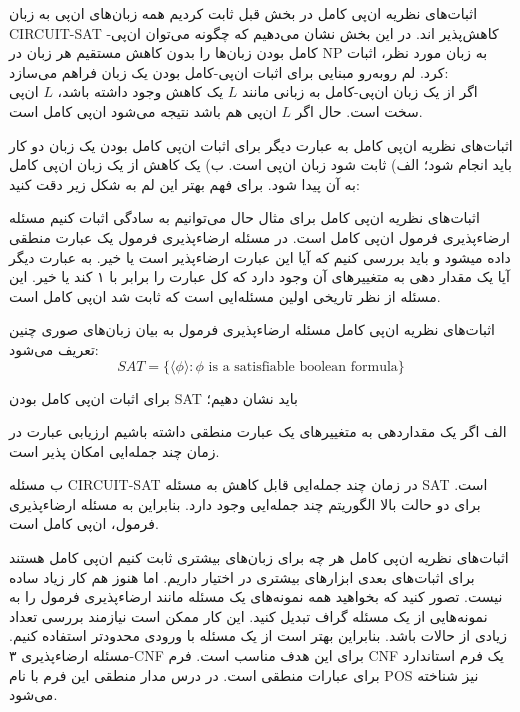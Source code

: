 \begin{itemframe}{اثبات‌های نظریه ان‌پی کامل}
\itm
در بخش قبل ثابت کردیم همه زبان‌های ان‌پی به زبان CIRCUIT-SAT کاهش‌پذیر اند.
\itm
در این بخش نشان می‌دهیم که چگونه می‌توان ان‌پی-کامل بودن زبان‌ها را بدون کاهش مستقیم هر زبان در NP به زبان مورد نظر، اثبات کرد.
\itm
لم روبه‌رو مبنایی برای اثبات ان‌پی-کامل بودن یک زبان فراهم می‌سازد:\\
اگر از یک زبان ان‌پی-کامل به زبانی مانند $L$ یک کاهش وجود داشته باشد، $L$ ان‌پی سخت است. حال اگر $L$ ان‌پی هم باشد نتیجه می‌شود ان‌پی کامل است.
\end{itemframe}


\begin{itemframe}{اثبات‌های نظریه ان‌پی کامل}
\itm
به عبارت دیگر برای اثبات ان‌پی کامل بودن یک زبان دو کار باید انجام شود؛‌ الف) ثابت شود زبان ان‌پی است. ب) یک کاهش از یک زبان ان‌پی کامل به آن پیدا شود.
\itm
برای فهم بهتر این لم به شکل زیر دقت کنید:
\end{itemframe}


\begin{itemframe}{اثبات‌های نظریه ان‌پی کامل}
\itm
برای مثال حال می‌توانیم به سادگی اثبات کنیم مسئله ارضاء‌پذیری فرمول
ان‌پی کامل است.
\itm
در مسئله ارضاءپذیری فرمول یک عبارت منطقی داده میشود و‌ باید بررسی کنیم که آیا این عبارت ارضاءپذیر است یا خیر. به عبارت دیگر آیا یک مقدار دهی به متغییرهای آن وجود دارد که کل عبارت را برابر با ۱ کند یا خیر.
\itm
این مسئله از نظر تاریخی اولین مسئله‌ایی است که ثابت شد ان‌پی کامل است.
\end{itemframe}


\begin{itemframe}{اثبات‌های نظریه ان‌پی کامل}
\itm
مسئله ارضاءپذیری فرمول به بیان زبان‌های صوری چنین تعریف می‌شود:
$$
SAT = \{\langle  \phi \rangle: \phi \text{ is a satisfiable boolean formula}\}
$$

\itm
برای اثبات ان‌پی کامل بودن SAT باید نشان دهیم؛
\item[الف]
اگر یک مقداردهی به متغییر‌های یک عبارت منطقی داشته باشیم ارزیابی عبارت در زمان چند جمله‌ایی امکان پذیر است.
\item[ب]
مسئله CIRCUIT-SAT در زمان چند جمله‌ایی قابل کاهش به مسئله SAT است.
\itm
برای دو حالت بالا الگوریتم چند جمله‌ایی وجود دارد. بنابراین به مسئله ارضاءپذیری فرمول، ان‌پی کامل است.
\end{itemframe}


\begin{itemframe}{اثبات‌های نظریه ان‌پی کامل}
\itm
هر چه برای زبان‌های بیشتری ثابت کنیم ان‌پی کامل هستند برای اثبات‌های بعدی ابزارهای بیشتری در اختیار داریم. اما هنوز هم کار زیاد ساده نیست.
\itm
تصور کنید که بخواهید همه نمونه‌های یک مسئله مانند ارضاءپذیری فرمول را به نمونه‌هایی از یک مسئله گراف تبدیل کنید. این کار ممکن است نیازمند بررسی تعداد زیادی از حالات باشد.
\itm
بنابراین بهتر است از یک مسئله با ورودی محدودتر استفاده کنیم. مسئله ارضاءپذیری ۳-CNF برای این هدف مناسب است.
\itm
فرم CNF یک فرم استاندارد برای عبارات منطقی است. در درس مدار منطقی این فرم با نام POS نیز شناخته می‌شود.
\end{itemframe}



